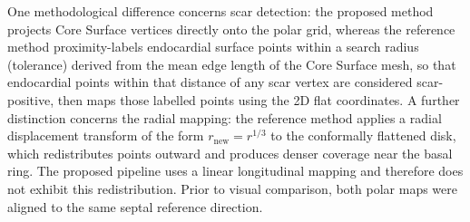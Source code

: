 One methodological difference concerns scar detection: the proposed method projects Core
Surface vertices directly onto the polar grid, whereas the reference method proximity-labels
endocardial surface points within a search radius (tolerance) derived from the mean edge
length of the Core Surface mesh, so that endocardial points within that distance of any scar
vertex are considered scar-positive, then maps those labelled points using the 2D flat
coordinates. A further distinction concerns
the radial mapping: the reference method applies a radial displacement transform of the form
$r_\text{new} = r^{1/3}$ to the conformally flattened disk, which redistributes points
outward and produces denser coverage near the basal ring. The
proposed pipeline uses a linear longitudinal mapping and therefore does not exhibit this
redistribution. Prior to visual comparison, both polar maps were aligned to the same septal
reference direction.

